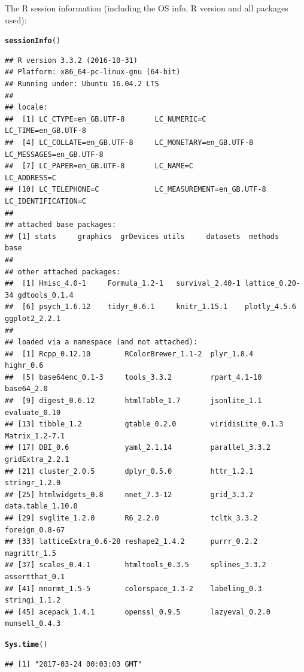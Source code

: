 \documentclass{article}\usepackage[]{graphicx}\usepackage[]{color}
\makeatletter
\newcommand{\hlstd}[1]{\textcolor[rgb]{0.345,0.345,0.345}{#1}}%
\newcommand{\hlkwd}[1]{\textcolor[rgb]{0.737,0.353,0.396}{\textbf{#1}}}%
\newenvironment{kframe}{%
 \def\at@end@of@kframe{}%
 \ifinner\ifhmode%
  \def\at@end@of@kframe{\end{minipage}}%
  \begin{minipage}{\columnwidth}%
 \fi\fi%
 \def\FrameCommand##1{\hskip\@totalleftmargin \hskip-\fboxsep
 \colorbox{shadecolor}{##1}\hskip-\fboxsep
     \hskip-\linewidth \hskip-\@totalleftmargin \hskip\columnwidth}%
 \MakeFramed {\advance\hsize-\width
   \@totalleftmargin\z@ \linewidth\hsize
   \@setminipage}}%
 {\par\unskip\endMakeFramed%
 \at@end@of@kframe}
\newenvironment{knitrout}{}{} %
\makeatother
\begin{document}
The R session information (including the OS info, R version and all
packages used):

\begin{knitrout}
\color{fgcolor}\begin{kframe}
\begin{alltt}
\hlkwd{sessionInfo}\hlstd{()}
\end{alltt}
\begin{verbatim}
## R version 3.3.2 (2016-10-31)
## Platform: x86_64-pc-linux-gnu (64-bit)
## Running under: Ubuntu 16.04.2 LTS
## 
## locale:
##  [1] LC_CTYPE=en_GB.UTF-8       LC_NUMERIC=C               LC_TIME=en_GB.UTF-8       
##  [4] LC_COLLATE=en_GB.UTF-8     LC_MONETARY=en_GB.UTF-8    LC_MESSAGES=en_GB.UTF-8   
##  [7] LC_PAPER=en_GB.UTF-8       LC_NAME=C                  LC_ADDRESS=C              
## [10] LC_TELEPHONE=C             LC_MEASUREMENT=en_GB.UTF-8 LC_IDENTIFICATION=C       
## 
## attached base packages:
## [1] stats     graphics  grDevices utils     datasets  methods   base     
## 
## other attached packages:
##  [1] Hmisc_4.0-1     Formula_1.2-1   survival_2.40-1 lattice_0.20-34 gdtools_0.1.4  
##  [6] psych_1.6.12    tidyr_0.6.1     knitr_1.15.1    plotly_4.5.6    ggplot2_2.2.1  
## 
## loaded via a namespace (and not attached):
##  [1] Rcpp_0.12.10        RColorBrewer_1.1-2  plyr_1.8.4          highr_0.6          
##  [5] base64enc_0.1-3     tools_3.3.2         rpart_4.1-10        base64_2.0         
##  [9] digest_0.6.12       htmlTable_1.7       jsonlite_1.1        evaluate_0.10      
## [13] tibble_1.2          gtable_0.2.0        viridisLite_0.1.3   Matrix_1.2-7.1     
## [17] DBI_0.6             yaml_2.1.14         parallel_3.3.2      gridExtra_2.2.1    
## [21] cluster_2.0.5       dplyr_0.5.0         httr_1.2.1          stringr_1.2.0      
## [25] htmlwidgets_0.8     nnet_7.3-12         grid_3.3.2          data.table_1.10.0  
## [29] svglite_1.2.0       R6_2.2.0            tcltk_3.3.2         foreign_0.8-67     
## [33] latticeExtra_0.6-28 reshape2_1.4.2      purrr_0.2.2         magrittr_1.5       
## [37] scales_0.4.1        htmltools_0.3.5     splines_3.3.2       assertthat_0.1     
## [41] mnormt_1.5-5        colorspace_1.3-2    labeling_0.3        stringi_1.1.2      
## [45] acepack_1.4.1       openssl_0.9.5       lazyeval_0.2.0      munsell_0.4.3
\end{verbatim}
\begin{alltt}
\hlkwd{Sys.time}\hlstd{()}
\end{alltt}
\begin{verbatim}
## [1] "2017-03-24 00:03:03 GMT"
\end{verbatim}
\end{kframe}
\end{knitrout}
\end{document}
